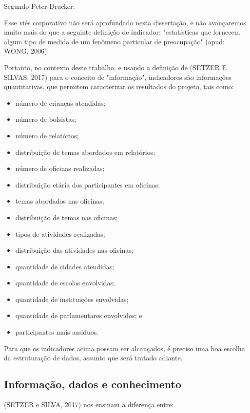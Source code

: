 Segundo Peter Drucker:


\noindent\begin{center}\mbox{\centering{}}\end{center}


Esse viés corporativo não será aprofundado nesta dissertação, e não avançaremos muito mais do que a seguinte definição de indicador: "estatísticas que fornecem algum tipo de medida de um fenômeno particular de preocupação" (apud: WONG, 2006).

Portanto, no contexto deste trabalho, e usando a definição de (SETZER E SILVAS, 2017) para o conceito de "informação", indicadores são informações quantitativas, que permitem caracterizar os resultados do projeto, tais como:


\begin{itemize}
\item número de crianças atendidas;
\item número de bolsistas;
\item número de relatórios;
\item distribuição de temas abordados em relatórios;
\item número de oficinas realizadas;
\item distribuição etária dos participantes em oficinas;
\item temas abordados nas oficinas;
\item distribuição de temas nas oficinas;
\item tipos de atividades realizadas;
\item distribuição das atividades nas oficinas;
\item quantidade de cidades atendidas;
\item quantidade de escolas envolvidas;
\item quantidade de instituições envolvidas;
\item quantidade de parlamentares envolvidos; e
\item participantes mais assíduos.
\end{itemize}

Para que os indicadores acima possam ser alcançados, é preciso uma boa escolha da estruturação de dados, assunto que será tratado adiante.

\subsection[Informação, dados e conhecimento]{Informação, dados e conhecimento}\label{Informação, dados e conhecimento}
(SETZER e SILVA, 2017)  nos ensinam a diferença entre:


